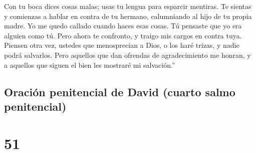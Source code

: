  Con tu boca dices cosas malas; usas tu lengua para
esparcir mentiras.  Te sientas y comienzas a hablar en
contra de tu hermano, calumniando al hijo de tu propia madre.
 Yo me quedo callado cuando haces esas cosas. Tú pensaste
que yo era alguien como tú. Pero ahora te confronto, y traigo mis cargos
en contra tuya.  Piensen otra vez, ustedes que menosprecian
a Dios, o los haré trizas, y nadie podrá salvarlos.  Pero
aquellos que dan ofrendas de agradecimiento me honran, y a aquellos que
siguen el bien les mostraré mi salvación.''

\hypertarget{oraciuxf3n-penitencial-de-david-cuarto-salmo-penitencial}{%
\subsection{Oración penitencial de David (cuarto salmo
penitencial)}\label{oraciuxf3n-penitencial-de-david-cuarto-salmo-penitencial}}

\hypertarget{section-50}{%
\section{51}\label{section-50}}

